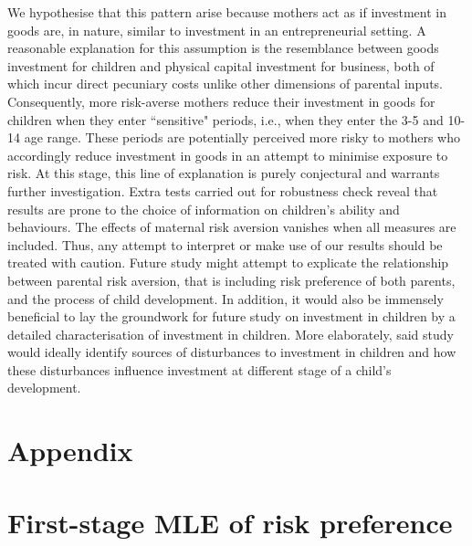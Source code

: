 \documentclass[emulatestandardclasses, 10pt, abstract = true]{scrartcl}
\begin{document}
We hypothesise that this pattern arise because mothers act as if investment in goods are, in nature, similar to investment in an entrepreneurial setting. A reasonable explanation for this assumption is the resemblance between goods investment for children and physical capital investment for business, both of which incur direct pecuniary costs unlike other dimensions of parental inputs. Consequently, more risk-averse mothers reduce their investment in goods for children when they enter ``sensitive" periods, i.e., when they enter the 3-5 and 10-14 age range. These periods are potentially perceived more risky to mothers who accordingly reduce investment in goods in an attempt to minimise exposure to risk. At this stage, this line of explanation is purely conjectural and warrants further investigation. Extra tests carried out for robustness check reveal that results are prone to the choice of information on children's ability and behaviours. The effects of maternal risk aversion vanishes when all measures are included. Thus, any attempt to interpret or make use of our results should be treated with caution. Future study might attempt to explicate the relationship between parental risk aversion, that is including risk preference of both parents, and the process of child development. In addition, it would also be immensely beneficial to lay the groundwork for future study on investment in children by a detailed characterisation of investment in children. More elaborately, said study would ideally identify sources of disturbances to investment in children and how these disturbances influence investment at different stage of a child's development.




\pagebreak





\pagebreak

\section*{Appendix}
\appendix

\setcounter{secnumdepth}{3}

\section{First-stage MLE of risk preference}
\end{document}
